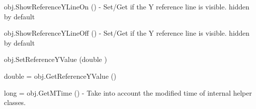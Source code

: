 \begin{DoxyItemize}
\item {\ttfamily obj.\-Show\-Reference\-Y\-Line\-On ()} -\/ Set/\-Get if the Y reference line is visible. hidden by default  
\item {\ttfamily obj.\-Show\-Reference\-Y\-Line\-Off ()} -\/ Set/\-Get if the Y reference line is visible. hidden by default  
\item {\ttfamily obj.\-Set\-Reference\-Y\-Value (double )}  
\item {\ttfamily double = obj.\-Get\-Reference\-Y\-Value ()}  
\item {\ttfamily long = obj.\-Get\-M\-Time ()} -\/ Take into account the modified time of internal helper classes.  
\end{DoxyItemize}